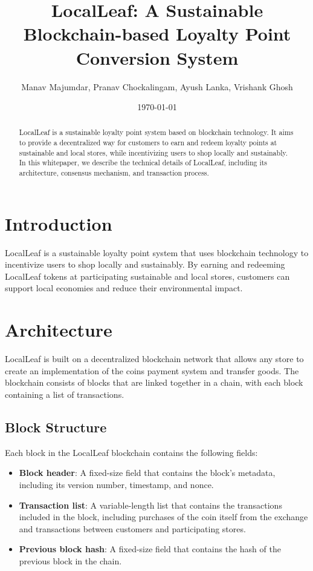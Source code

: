 \documentclass{article}
\title{LocalLeaf: A Sustainable Blockchain-based Loyalty Point Conversion System}
\author{Manav Majumdar, Pranav Chockalingam, Ayush Lanka, Vrishank Ghosh}
\date{\today}
\begin{document}
\maketitle

\begin{abstract}
LocalLeaf is a sustainable loyalty point system based on blockchain technology. It aims to provide a decentralized way for customers to earn and redeem loyalty points at sustainable and local stores, while incentivizing users to shop locally and sustainably. In this whitepaper, we describe the technical details of LocalLeaf, including its architecture, consensus mechanism, and transaction process.
\end{abstract}

\section{Introduction}

LocalLeaf is a sustainable loyalty point system that uses blockchain technology to incentivize users to shop locally and sustainably. By earning and redeeming LocalLeaf tokens at participating sustainable and local stores, customers can support local economies and reduce their environmental impact.

\section{Architecture}

LocalLeaf is built on a decentralized blockchain network that allows any store to create an implementation of the coins payment system and transfer goods. The blockchain consists of blocks that are linked together in a chain, with each block containing a list of transactions.

\subsection{Block Structure}

Each block in the LocalLeaf blockchain contains the following fields:

\begin{itemize}
\item \textbf{Block header}: A fixed-size field that contains the block's metadata, including its version number, timestamp, and nonce.
\item \textbf{Transaction list}: A variable-length list that contains the transactions included in the block, including purchases of the coin itself from the exchange and transactions between customers and participating stores.
\item \textbf{Previous block hash}: A fixed-size field that contains the hash of the previous block in the chain.
\end{itemize}
\end{document}
